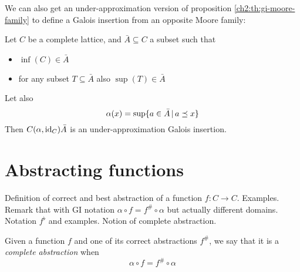 We can also get an under-approximation version of proposition \ref{ch2:th:gi-moore-family} to define a Galois insertion from an opposite Moore family:
\begin{prop}\label{ch2:th:under-gi-moore-family}
	Let $C$ be a complete lattice, and $\bar{A} \subseteq C$ a subset such that
	\begin{itemize}
		\item $\inf(C) \in \bar{A}$
		\item for any subset $T \subseteq \bar{A}$ also $\sup(T) \in \bar{A}$
	\end{itemize}
	Let also
	\[
	\alpha(x) = \sup\{ a \in \bar{A} \,\vert\, a \preceq x \}
	\]
	Then $C(\alpha, \text{id}_C) \bar{A}$ is an under-approximation Galois insertion.
\end{prop}

\section{Abstracting functions}
Definition of correct and best abstraction of a function $f: C \rightarrow C$. Examples.
Remark that with GI notation $\alpha \circ f = f^{\#} \circ \alpha$ but actually different domains.
Notation $f^{\flat}$ and examples.
Notion of complete abstraction.
\begin{definition}\label{ch2:def:complete-abstr}
	Given a function $f$ and one of its correct abstractions $f^{\#}$, we say that it is a \textit{complete abstraction} when
	\[
	\alpha \circ f = f^{\#} \circ \alpha
	\]
\end{definition}
